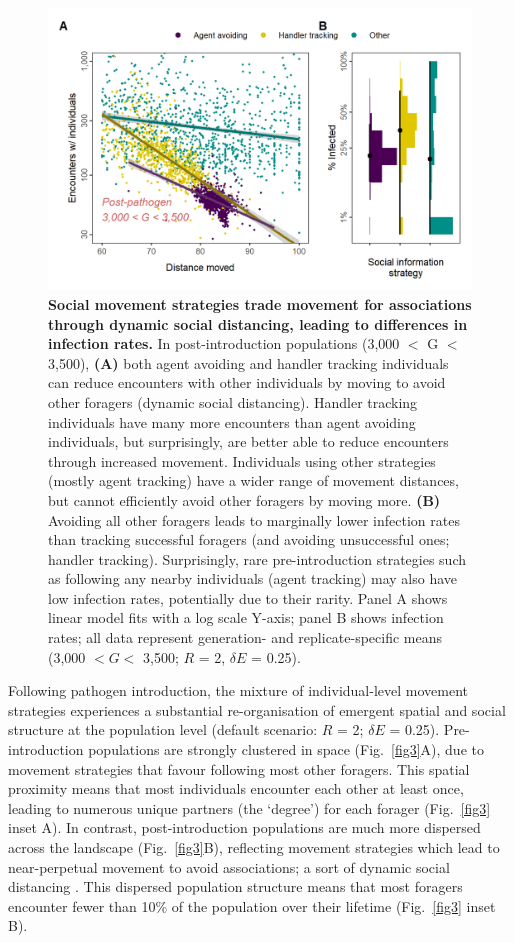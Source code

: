 \begin{figure}[!h]
    \centering
    \includegraphics[width=0.9\linewidth]{figures/pathomove/fig_02.png}
    \caption{
        \textbf{Social movement strategies trade movement for associations through dynamic social distancing, leading to differences in infection rates.}
        In post-introduction populations (3,000 $<$ G $<$ 3,500), \textbf{(A)} both agent avoiding and handler tracking individuals can reduce encounters with other individuals by moving to avoid other foragers (dynamic social distancing).
        Handler tracking individuals have many more encounters than agent avoiding individuals, but surprisingly, are better able to reduce encounters through increased movement.
        Individuals using other strategies (mostly agent tracking) have a wider range of movement distances, but cannot efficiently avoid other foragers by moving more.
        \textbf{(B)} Avoiding all other foragers leads to marginally lower infection rates than tracking successful foragers (and avoiding unsuccessful ones; handler tracking).
        Surprisingly, rare pre-introduction strategies such as following any nearby individuals (agent tracking) may also have low infection rates, potentially due to their rarity.
        Panel A shows linear model fits with a log scale Y-axis; panel B shows infection rates; all data represent generation- and replicate-specific means (3,000 $< G <$ 3,500; $R$ = 2, $\delta E$ = 0.25).
    }\label{fig2}
\end{figure}

Following pathogen introduction, the mixture of individual-level movement strategies experiences a substantial re-organisation of emergent spatial and social structure at the population level (default scenario: $R$ = 2; $\delta E$ = 0.25).
Pre-introduction populations are strongly clustered in space (Fig.~\ref{fig3}A), due to movement strategies that favour following most other foragers.
This spatial proximity means that most individuals encounter each other at least once, leading to numerous unique partners (the `degree') for each forager (Fig.~\ref{fig3} inset A).
In contrast, post-introduction populations are much more dispersed across the landscape (Fig.~\ref{fig3}B), reflecting movement strategies which lead to near-perpetual movement to avoid associations; a sort of dynamic social distancing \citep{pusceddu2021}.
This dispersed population structure means that most foragers encounter fewer than 10\% of the population over their lifetime (Fig.~\ref{fig3} inset B).

